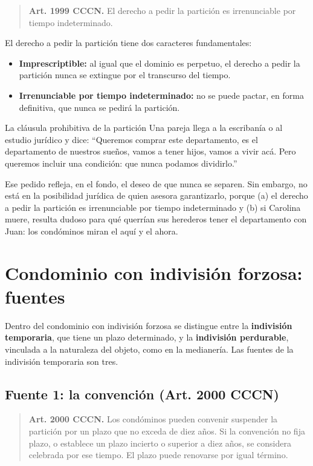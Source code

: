 \documentclass[12pt,oneside]{book}
\begin{document}
\begin{quote}
\textbf{Art. 1999 CCCN.} El derecho a pedir la partición es irrenunciable por tiempo indeterminado.
\end{quote}

El derecho a pedir la partición tiene dos caracteres fundamentales:

\begin{itemize}
    \item \textbf{Imprescriptible:} al igual que el dominio es perpetuo, el derecho a pedir la partición nunca se extingue por el transcurso del tiempo.
    \item \textbf{Irrenunciable por tiempo indeterminado:} no se puede pactar, en forma definitiva, que nunca se pedirá la partición.
\end{itemize}

\begin{example}{La cláusula prohibitiva de la partición}
Una pareja llega a la escribanía o al estudio jurídico y dice: ``Queremos comprar este departamento, es el departamento de nuestros sueños, vamos a tener hijos, vamos a vivir acá. Pero queremos incluir una condición: que nunca podamos dividirlo.''

Ese pedido refleja, en el fondo, el deseo de que nunca se separen. Sin embargo, no está en la posibilidad jurídica de quien asesora garantizarlo, porque (a) el derecho a pedir la partición es irrenunciable por tiempo indeterminado y (b) si Carolina muere, resulta dudoso para qué querrían sus herederos tener el departamento con Juan: los condóminos miran el aquí y el ahora.
\end{example}

\section{Condominio con indivisión forzosa: fuentes}

Dentro del condominio con indivisión forzosa se distingue entre la \textbf{indivisión temporaria}, que tiene un plazo determinado, y la \textbf{indivisión perdurable}, vinculada a la naturaleza del objeto, como en la medianería. Las fuentes de la indivisión temporaria son tres.

\subsection{Fuente 1: la convención (Art. 2000 CCCN)}

\begin{quote}
\textbf{Art. 2000 CCCN.} Los condóminos pueden convenir suspender la partición por un plazo que no exceda de diez años. Si la convención no fija plazo, o establece un plazo incierto o superior a diez años, se considera celebrada por ese tiempo. El plazo puede renovarse por igual término.
\end{quote}
\end{document}
